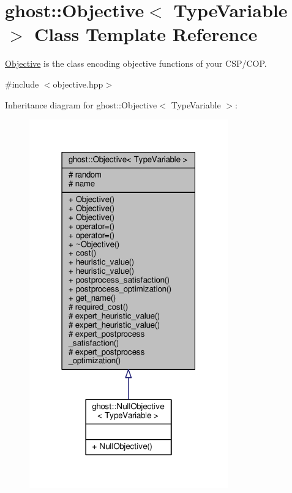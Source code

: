 \hypertarget{classghost_1_1Objective}{}\section{ghost\+:\+:Objective$<$ Type\+Variable $>$ Class Template Reference}
\label{classghost_1_1Objective}


\hyperlink{classghost_1_1Objective}{Objective} is the class encoding objective functions of your C\+S\+P/\+C\+OP.  




{\ttfamily \#include $<$objective.\+hpp$>$}



Inheritance diagram for ghost\+:\+:Objective$<$ Type\+Variable $>$\+:\nopagebreak
\begin{figure}[H]
\begin{center}
\leavevmode
\includegraphics[width=243pt]{classghost_1_1Objective__inherit__graph}
\end{center}
\end{figure}


